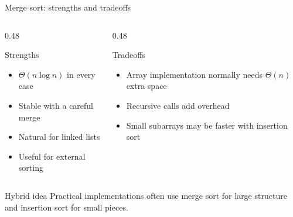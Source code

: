 \documentclass[aspectratio=169]{beamer}
\begin{document}
\begin{frame}{Merge sort: strengths and tradeoffs}
  \small
  \begin{columns}[T]
    \begin{column}{0.48\textwidth}
      \begin{exampleblock}{Strengths}
        \begin{itemize}
          \item $\Theta(n\log n)$ in every case
          \item Stable with a careful merge
          \item Natural for linked lists
          \item Useful for external sorting
        \end{itemize}
      \end{exampleblock}
    \end{column}
    \begin{column}{0.48\textwidth}
      \begin{alertblock}{Tradeoffs}
        \begin{itemize}
          \item Array implementation normally needs $\Theta(n)$ extra space
          \item Recursive calls add overhead
          \item Small subarrays may be faster with insertion sort
        \end{itemize}
      \end{alertblock}
    \end{column}
  \end{columns}
  \begin{block}{Hybrid idea}
    Practical implementations often use merge sort for large structure and
    insertion sort for small pieces.
  \end{block}
\end{frame}
\end{document}
